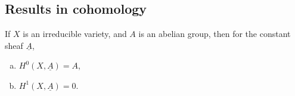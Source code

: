 \subsection{Results in cohomology}

\begin{prop}\label{prop:const_sheaf}
  If $X$ is an irreducible variety, and $A$ is an abelian group,
  then for the constant sheaf $\underline{A}$,
  \begin{enumerate}[(a)]
    \item $H^{0}(X,\underline{A}) = A$,
    \item $H^{1}(X,\underline{A})=0$.
  \end{enumerate}
\end{prop}
